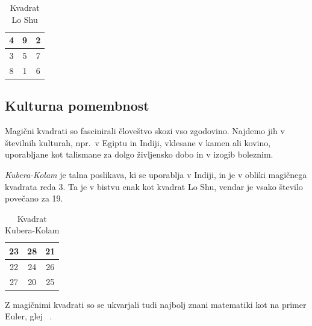 \documentclass[a4paper,12pt]{article}
\begin{document}

\begin{table}
   \caption{Kvadrat Lo Shu}
   \label{table:loshu}
   \large
   \centering
   \begin{tabular}{|c|c|c|}
      \hline
      4 & 9 & 2 \\\hline
      3 & 5 & 7 \\\hline
      8 & 1 & 6 \\\hline
   \end{tabular}
\end{table}


\subsection{Kulturna pomembnost}

Magični kvadrati so fascinirali človeštvo skozi vso zgodovino. Najdemo jih
v številnih kulturah, npr.\ v Egiptu in Indiji, vklesane v kamen ali
kovino, uporabljane kot talismane za dolgo življensko dobo in v
izogib boleznim.

\emph{Kubera-Kolam} je talna poslikava, ki se uporablja v Indiji, in je v
obliki magičnega kvadrata reda 3. Ta je v bistvu enak kot kvadrat
Lo Shu, vendar je vsako število povečano za 19.


\begin{table}
   \caption{Kvadrat Kubera-Kolam}
   \label{table:kubera}
   \large
   \centering
   \begin{tabular}{|c|c|c|}
      \hline
      23 & 28 & 21 \\\hline
      22 & 24 & 26 \\\hline
      27 & 20 & 25 \\\hline
   \end{tabular}
\end{table}
Z magičnimi kvadrati so se ukvarjali tudi najbolj znani matematiki kot na
primer Euler, glej ~\cite{euler}. %
\end{document}
